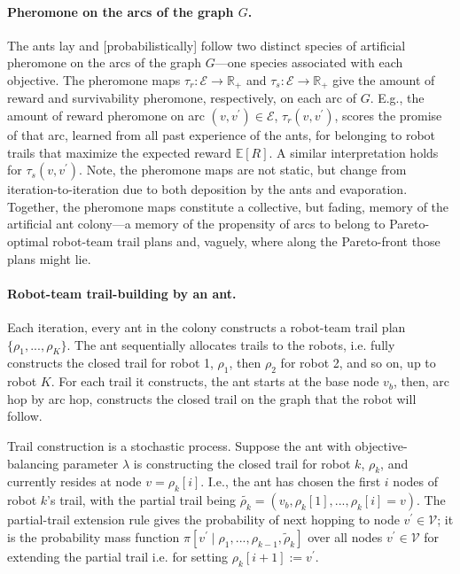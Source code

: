 \documentclass[11pt, oneside]{article}
\begin{document}
\paragraph{Pheromone on the arcs of the graph $G$.}
The ants lay and [probabilistically] follow two distinct species of artificial pheromone on the arcs of the graph $G$---one species associated with each objective. 
The pheromone maps $\tau_r:\mathcal{E}\rightarrow \mathbb{R}_+$ and $\tau_s:\mathcal{E}\rightarrow \mathbb{R}_+$ give the amount of reward and survivability pheromone, respectively, on each arc of $G$.
E.g., the amount of reward pheromone on arc $(v, v^\prime)\in\mathcal{E}$, $\tau_r(v, v^\prime)$, scores the promise of that arc, learned from all past experience of the ants, for belonging to robot trails that maximize the expected reward $\mathbb{E}[R]$. A similar interpretation holds for $\tau_s(v, v^\prime)$. 
Note, the pheromone maps are not static, but change from iteration-to-iteration due to both deposition by the ants and evaporation. 
Together, the pheromone maps constitute a collective, but fading, memory of the artificial ant colony---a memory of the propensity of arcs to belong to Pareto-optimal robot-team trail plans and, vaguely, where along the Pareto-front those plans might lie.

 
\paragraph{Robot-team trail-building by an ant.}
Each iteration, every ant in the colony constructs a robot-team trail plan $\{\rho_1, ..., \rho_K\}$.
The ant sequentially allocates trails to the robots, 
i.e. fully constructs the closed trail for robot 1, $\rho_1$, then $\rho_2$ for robot 2, and so on, up to robot $K$.
For each trail it constructs, the ant starts at the base node $v_b$, then, arc hop by arc hop, constructs the closed trail on the graph that the robot will follow. 

Trail construction is a stochastic process. Suppose the ant with objective-balancing parameter $\lambda$ is constructing the closed trail for robot $k$, $\rho_k$, and currently resides at node $v=\rho_k[i]$.
I.e., the ant has chosen the first $i$ nodes of robot $k$'s trail, with the partial trail being $\tilde{\rho_k}=(v_b, \rho_k[1], ..., \rho_k[i]=v)$.
The partial-trail extension rule gives the probability of next hopping to node $v^\prime\in\mathcal{V}$; it is the probability mass function $\pi[v^\prime \mid \rho_1, ..., \rho_{k-1}, \tilde{\rho}_k]$ over all nodes $v^\prime \in \mathcal{V}$ for extending the partial trail i.e. for setting $\rho_k[i+1]:=v^\prime$.
\end{document}
